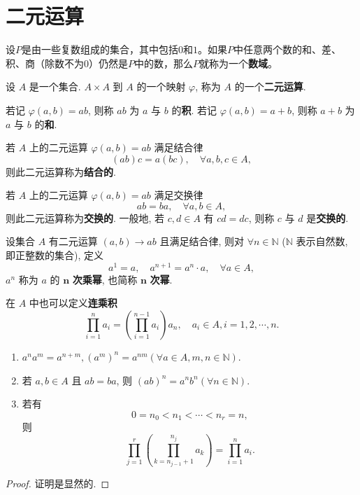 \documentclass[../../main.tex]{subfiles}%
\begin{document}
\section{二元运算}

\begin{definition}[数域]
设$P$是由一些复数组成的集合，其中包括$0$和$1$。如果$P$中任意两个数的和、差、积、商（除数不为$0$）仍然是$P$中的数，那么$P$就称为一个\textbf{数域}。
\end{definition}

\begin{definition}
设 \( A \) 是一个集合. \( A \times A \) 到 \( A \) 的一个映射 \( \varphi \), 称为 \( A \) 的一个\textbf{二元运算}.

若记 \( \varphi(a,b) = ab \), 则称 \( ab \) 为 \( a \) 与 \( b \) 的\textbf{积}. 若记 \( \varphi(a,b) = a + b \), 则称 \( a + b \) 为 \( a \) 与 \( b \) 的\textbf{和}.

若 \( A \) 上的二元运算 \( \varphi(a,b) = ab \) 满足结合律
\[
(ab)c = a(bc),\quad \forall a,b,c \in A,
\]
则此二元运算称为\textbf{结合的}.

若 \( A \) 上的二元运算 \( \varphi(a,b) = ab \) 满足交换律
\[
ab = ba,\quad \forall a,b \in A,
\]
则此二元运算称为\textbf{交换的}. 一般地, 若 \( c,d \in A \) 有 \( cd = dc \), 则称 \( c \) 与 \( d \) 是\textbf{交换的}.
\end{definition}

\begin{definition}\label{definition:n次乘幂}
设集合 \( A \) 有二元运算 \( (a,b) \to ab \) 且满足结合律, 则对 \( \forall n \in \mathbb{N} \) (\( \mathbb{N} \) 表示自然数, 即正整数的集合), 定义
\[
a^1 = a,\quad a^{n + 1} = a^n \cdot a,\quad \forall a \in A,
\]
\( a^n \) 称为 \( a \) 的  \( \boldsymbol{n} \) \textbf{次乘幂}, 也简称 \( \boldsymbol{n} \) \textbf{次幂}.

在 \( A \) 中也可以定义\textbf{连乘积}
\[
\prod_{i = 1}^n a_i = \left( \prod_{i = 1}^{n - 1} a_i \right) a_n,\quad a_i \in A, i = 1,2,\cdots, n.
\]
\end{definition}

\begin{proposition}\label{proposition:乘幂和连乘积的性质}
\begin{enumerate}
\item \( a^n a^m = a^{n + m}, (a^m)^n = a^{nm} (\forall a \in A, m,n \in \mathbb{N}) \). 

\item 若 \( a,b \in A \) 且 \( ab = ba \), 则 \( (ab)^n = a^n b^n (\forall n \in \mathbb{N}) \).

\item 若有
\[
0 = n_0 < n_1 < \cdots < n_r = n,
\]
则
\[
\prod_{j = 1}^r \left( \prod_{k = n_{j - 1} + 1}^{n_j} a_k \right) = \prod_{i = 1}^n a_i.
\]
\end{enumerate}
\end{proposition}
\begin{proof}
证明是显然的.
\end{proof}
\end{document}
